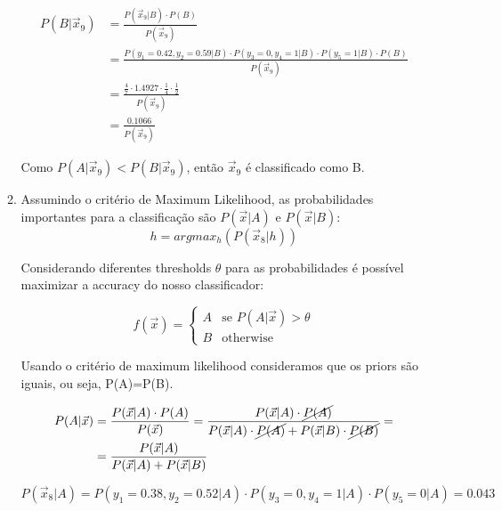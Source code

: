 \documentclass[a4paper,12pt]{article} %
\begin{document}
\begin{enumerate}
\begin{enumerate}
\begin{equation*}
    \begin{aligned}
        P(B|\vec{x}_9) & = \frac{P(\vec{x}_9|B) \cdot P(B)}{P(\vec{x}_9)} \\
                       & = \frac{P(y_1=0.42,y_2=0.59|B) \cdot P(y_3=0,y_4=1|B) \cdot P(y_5=1|B) \cdot P(B)}{P(\vec{x}_9)} \\
                       & = \frac{\frac{4}{7} \cdot 1.4927 \cdot \frac{1}{4} \cdot \frac{1}{2}}{P(\vec{x}_9)} \\
                       & = \frac{0.1066}{P(\vec{x}_9)}
    \end{aligned}
\end{equation*}

Como $P(A|\vec{x}_9) < P(B|\vec{x}_9)$, então $\vec{x}_9$ é classificado como B. 

\item 
Assumindo o critério de Maximum Likelihood, as probabilidades importantes para a classificação são $P(\vec{x}|A)$ e $P(\vec{x}|B)$:
\begin{equation*}
    h = argmax_{h}(P(\vec{x}_8|h))
\end{equation*}

Considerando diferentes thresholds $\theta$ para as probabilidades é possível maximizar a accuracy do nosso classificador:

\begin{equation*}
    f(\vec{x}) = \begin{cases} 
        A & \text{se } P(A|\vec{x}) > \theta \\
        B &  \text{otherwise}
     \end{cases}
\end{equation*}

Usando o critério de maximum likelihood consideramos que os priors são iguais, ou seja, P(A)=P(B).

\begin{equation*}
    \begin{aligned}
        P(A|\vec{x}) & = \frac{P(\vec{x}|A) \cdot P(A)}{P(\vec{x})} = \frac{P(\vec{x}|A) \cdot \cancel{P(A)}}{P(\vec{x}|A) \cdot \cancel{P(A)} + P(\vec{x}|B) \cdot \cancel{P(B)}} = \\
        & = \frac{P(\vec{x}|A)}{P(\vec{x}|A)+P(\vec{x}|B)}
    \end{aligned}
\end{equation*}

\begin{equation*}
    P(\vec{x}_8|A) = P(y_1=0.38,y_2=0.52|A) \cdot P(y_3=0,y_4=1|A) \cdot P(y_5=0|A) = 0.043
\end{equation*}


\end{enumerate}
\end{enumerate}
\end{document}
